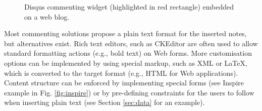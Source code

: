 \begin{figure}[!h]
  \centering
  \caption[Disqus commenting widget embedded on a web blog]
          {Disqus commenting widget (highlighted in red rectangle) embedded on a web blog.}
  \label{fig:disqus}
\end{figure}

Most commenting solutions propose a plain text format for the inserted notes,
but alternatives exist. Rich text editors, such as CKEditor \cite{ref:cked} are
often used to allow standard formatting actions (e.g., bold text) on Web forms.
More customisation options can be implemented by using special markup, such as
XML or LaTeX, which is converted to the target format (e.g., HTML for Web
applications). Content structure can be enforced by implementing special forms
(see Inspire example in Fig. \ref{fig:inspire}) or by pre-defining constraints
for the users to follow when inserting plain text (see Section \ref{sec:data}
for an example).

